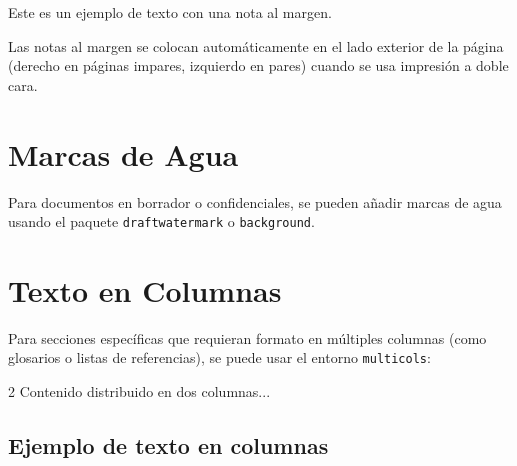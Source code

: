 Este es un ejemplo de texto con una nota al margen.

Las notas al margen se colocan automáticamente en el lado exterior de la
página (derecho en páginas impares, izquierdo en pares) cuando se usa
impresión a doble cara.

\section{Marcas de Agua}
\label{sec:marcas-agua}

Para documentos en borrador o confidenciales, se pueden añadir marcas de agua
usando el paquete \texttt{draftwatermark} o \texttt{background}.

\begin{latexcode}[title={Marca de agua con draftwatermark}]
\usepackage{draftwatermark}
\end{latexcode}

\section{Texto en Columnas}
\label{sec:columnas}

Para secciones específicas que requieran formato en múltiples columnas
(como glosarios o listas de referencias), se puede usar el entorno
\texttt{multicols}:

\begin{latexcode}[title={Texto en dos columnas}]
\begin{multicols}{2}
  Contenido distribuido en dos columnas...
\end{multicols}
\end{latexcode}

\subsection{Ejemplo de texto en columnas}
\label{subsec:ejemplo-multicols}

